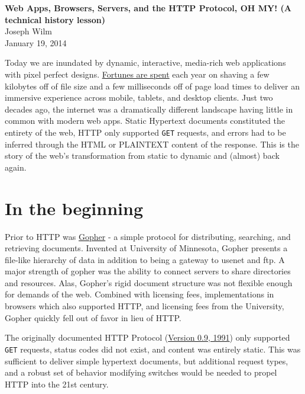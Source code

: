 \documentclass[12pt,letterpaper,fleqn]{article}
\newcommand{\jurl}[2]{\textcolor{myblue}{\href{#2}{#1}}}
\newcommand{\code}[1]{\texttt{#1}}
\begin{document}
\begin{center}
{\Large \textbf{Web Apps, Browsers, Servers, and the HTTP Protocol, OH MY! (A technical history lesson)}}\\
\vspace{5mm}
Joseph Wilm \\
January 19, 2014\\
\end{center}

Today we are inundated by dynamic, interactive, media-rich web applications with pixel perfect designs. \jurl{Fortunes are spent}{http://www.fastcompany.com/1825005/how-one-second-could-cost-amazon-16-billion-sales} each year on shaving a few kilobytes off of file size and a few milliseconds off of page load times to deliver an immersive experience across mobile, tablets, and desktop clients. Just two decades ago, the internet was a dramatically different landscape having little in common with modern web apps. Static Hypertext documents constituted the entirety of the web, HTTP only supported \code{GET} requests, and errors had to be inferred through the HTML or PLAINTEXT content of the response. This is the story of the web's transformation from static to dynamic and (almost) back again.

\section*{In the beginning}

Prior to HTTP was \jurl{Gopher}{http://en.wikipedia.org/wiki/Gopher_protocol} - a simple protocol for distributing, searching, and retrieving documents. Invented at University of Minnesota, Gopher presents a file-like hierarchy of data in addition to being a gateway to usenet and ftp. A major strength of gopher was the ability to connect servers to share directories and resources. Alas, Gopher's rigid document structure was not flexible enough for demands of the web. Combined with licensing fees, implementations in browsers which also supported HTTP, and licensing fees from the University, Gopher quickly fell out of favor in lieu of HTTP.

The originally documented HTTP Protocol (\jurl{Version 0.9, 1991}{http://www.w3.org/Protocols/HTTP/AsImplemented.html}) only supported \code{GET} requests, status codes did not exist, and content was entirely static. This was sufficient to deliver simple hypertext documents, but additional request types, and a robust set of behavior modifying switches would be needed to propel HTTP into the 21st century.
\end{document}
